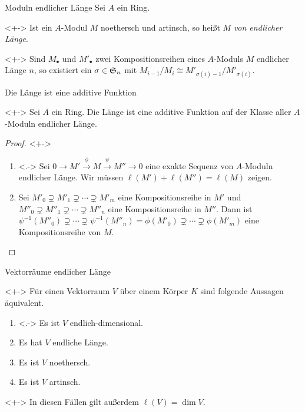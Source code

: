
\begin{frame}{Moduln endlicher Länge}
	Sei \(A\) ein Ring.
	\begin{definition}<+->
		Ist ein \(A\)-Modul \(M\) noethersch und artinsch, so heißt \(M\) \emph{von endlicher Länge}.
	\end{definition}
	\begin{remark}<+->
		Sind \(M_\bullet\) und \(M'_\bullet\) zwei Kompositionsreihen eines \(A\)-Moduls
		\(M\) endlicher Länge \(n\), so existiert ein \(\sigma \in \mathfrak S_n\) mit
		\(M_{i - 1}/M_i \cong M'_{\sigma(i) - 1}/M'_{\sigma(i)}\).
	\end{remark}
\end{frame}

\begin{frame}{Die Länge ist eine additive Funktion}
	\begin{proposition}<+->
		Sei \(A\) ein Ring.
		Die Länge ist eine additive Funktion auf der Klasse aller \(A\)-Moduln
		endlicher Länge.
	\end{proposition}
	\begin{proof}<+->
		\begin{enumerate}[<+->]
		\item<.->
			Sei \(0 \to M' \xrightarrow{\phi} M \xrightarrow{\psi} M'' \to 0\) eine exakte Sequenz von
			\(A\)-Moduln endlicher Länge. Wir müssen \(\ell(M') + \ell(M'') = \ell(M)\) zeigen.
		\item
			Sei \(M'_0 \supsetneq M'_1 \supsetneq \dotsb \supsetneq M'_m\) eine Kompositionsreihe in \(M'\)
			und \(M''_0 \supsetneq M''_1 \supsetneq \dotsb \supsetneq M''_n\) eine Kompositionsreihe in \(M''\).
			Dann ist \(\psi^{-1}(M''_0) \supsetneq \dotsb \supsetneq \psi^{-1}(M''_n)
			= \phi(M'_0) \supsetneq \dotsb \supsetneq \phi(M'_m)\) eine Kompositionsreihe von \(M\).
			\qedhere
		\end{enumerate}
	\end{proof}
\end{frame}

\begin{frame}{Vektorräume endlicher Länge}
	\begin{proposition}<+->
		Für einen Vektorraum \(V\) über einem Körper \(K\) sind folgende
		Aussagen äquivalent.
		\begin{enumerate}[<+->]
		\item<.->
			Es ist \(V\) endlich-dimensional.
		\item
			Es hat \(V\) endliche Länge.
		\item
			Es ist \(V\) noethersch.
		\item
			Es ist \(V\) artinsch.
		\end{enumerate}
		\begin{visibleenv}<+->
			In diesen Fällen gilt außerdem \(\ell(V) = \dim V\).
		\end{visibleenv}
	\end{proposition}
\end{frame}

